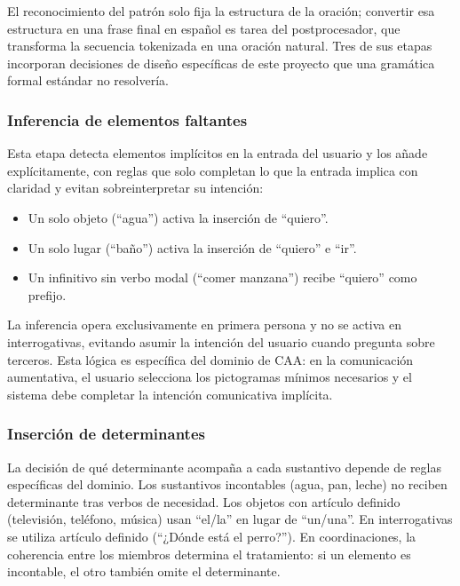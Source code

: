 El reconocimiento del patrón solo fija la estructura de la oración; convertir esa estructura en una frase final en español es tarea del postprocesador, que transforma la secuencia tokenizada en una oración natural. Tres de sus etapas incorporan decisiones de diseño específicas de este proyecto que una gramática formal estándar no resolvería.

\subsubsection{Inferencia de elementos faltantes}

Esta etapa detecta elementos implícitos en la entrada del usuario y los añade explícitamente, con reglas que solo completan lo que la entrada implica con claridad y evitan sobreinterpretar su intención:

\begin{itemize}
    \item Un solo objeto (``agua'') activa la inserción de ``quiero''.
    \item Un solo lugar (``baño'') activa la inserción de ``quiero'' e ``ir''.
    \item Un infinitivo sin verbo modal (``comer manzana'') recibe ``quiero'' como prefijo.
\end{itemize}

La inferencia opera exclusivamente en primera persona y no se activa en interrogativas, evitando asumir la intención del usuario cuando pregunta sobre terceros. Esta lógica es específica del dominio de CAA: en la comunicación aumentativa, el usuario selecciona los pictogramas mínimos necesarios y el sistema debe completar la intención comunicativa implícita.

\subsubsection{Inserción de determinantes}

La decisión de qué determinante acompaña a cada sustantivo depende de reglas específicas del dominio. Los sustantivos incontables (agua, pan, leche) no reciben determinante tras verbos de necesidad. Los objetos con artículo definido (televisión, teléfono, música) usan ``el/la'' en lugar de ``un/una''. En interrogativas se utiliza artículo definido (``¿Dónde está el perro?''). En coordinaciones, la coherencia entre los miembros determina el tratamiento: si un elemento es incontable, el otro también omite el determinante.

